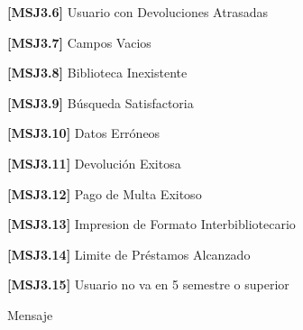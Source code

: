 	\begin{Citemize}
	\item {\bf [MSJ3.6]} Usuario con Devoluciones Atrasadas
	\end{Citemize}
	
	\begin{Citemize}
	\item {\bf [MSJ3.7]} Campos Vacios
	\end{Citemize}
	
	\begin{Citemize}
	\item {\bf [MSJ3.8]} Biblioteca Inexistente
	\end{Citemize}
	
	\begin{Citemize}
	\item {\bf [MSJ3.9]} Búsqueda Satisfactoria
	\end{Citemize}
	
	\begin{Citemize}
	\item {\bf [MSJ3.10]} Datos Erróneos
	\end{Citemize}
	
	\begin{Citemize}
	\item {\bf [MSJ3.11]} Devolución Exitosa
	\end{Citemize}
	
	\begin{Citemize}
	\item {\bf [MSJ3.12]} Pago de Multa Exitoso
	\end{Citemize}
	
	\begin{Citemize}
	\item {\bf [MSJ3.13]} Impresion de Formato Interbibliotecario
	\end{Citemize}
	
	\begin{Citemize}
	\item {\bf [MSJ3.14]} Limite de Préstamos Alcanzado
	\end{Citemize}
	
	\begin{Citemize}
	\item {\bf [MSJ3.15]} Usuario no va en 5 semestre o superior
	\end{Citemize}
	
\begin{Citemize}
	\item Mensaje 
\end{Citemize}

